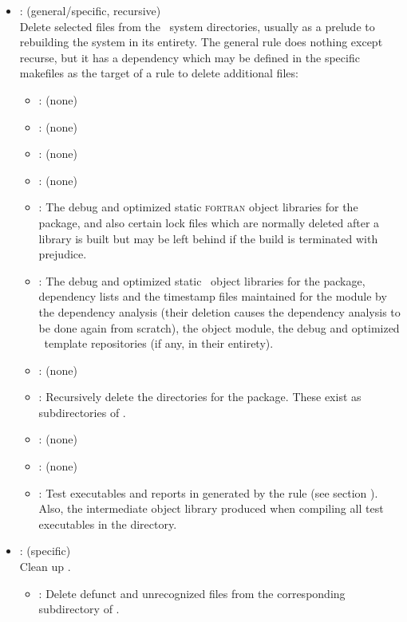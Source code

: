 \begin{itemize}
\item
    : (general/specific, recursive)
   \\ Delete selected files from the \aipspp\ system directories, usually
   as a prelude to rebuilding the system in its entirety.  The general rule
   does nothing except recurse, but it has a dependency which may be defined
   in the specific makefiles as the target of a rule to delete additional
   files:
   \begin{itemize}
   \item
      : (none)
   \item
      : (none)
   \item
      : (none)
   \item
      : (none)
   \item
      : The debug and optimized static \textsc{fortran} object
      libraries for the package, and also certain  lock files
      which are normally deleted after a library is built but may be left
      behind if the build is terminated with prejudice.
   \item
      : The debug and optimized static \cplusplus\ object libraries
      for the package, dependency lists and the timestamp files maintained
      for the module by the dependency analysis (their deletion causes the
      dependency analysis to be done again from scratch), the 
      object module, the debug and optimized \cplusplus\ template repositories
      (if any, in their entirety).
   \item
      : (none)
   \item
      : Recursively delete the  directories for the
      package.  These exist as subdirectories of .
   \item
      : (none)
   \item
      : (none)
   \item
      : Test executables and reports in 
      generated by the  rule (see section ).  Also, the intermediate object library produced when
      compiling all test executables in the directory.
   \end{itemize}

\item
    : (specific)
   \\ Clean up .
   \begin{itemize}
   \item
      : Delete defunct and unrecognized files from the corresponding
      subdirectory of .
   \end{itemize}


\end{itemize}
